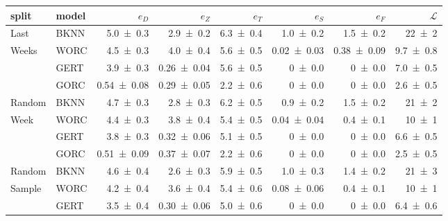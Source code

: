 \begin{table}[ht]
    \centering
    \begin{tabular}{llrrrrrr}
        \toprule
        split           & model &              $e_D$ &              $e_Z$ &              $e_T$ &              $e_S$ &              $e_F$ &      $\mathcal{L}$   \\
        \midrule
        Last            & BKNN  & \num{5.0 \pm 0.3 } & \num{2.9 \pm 0.2 } & \num{6.3 \pm 0.4 } & \num{1.0 \pm 0.2 } & \num{1.5 \pm 0.2 } & \num{22   \pm 2}   \\
        Weeks           & WORC  & \num{4.5 \pm 0.3 } & \num{4.0 \pm 0.4 } & \num{5.6 \pm 0.5 } & \num{0.02\pm 0.03} & \num{0.38\pm 0.09} & \num{ 9.7 \pm 0.8}   \\
                        & GERT  & \num{3.9 \pm 0.3 } & \num{0.26\pm 0.04} & \num{5.6 \pm 0.5 } & \num{0   \pm 0.0 } & \num{0   \pm 0.0 } & \num{ 7.0 \pm 0.5}   \\
                        & GORC  & \num{0.54\pm 0.08} & \num{0.29\pm 0.05} & \num{2.2 \pm 0.6 } & \num{0   \pm 0.0 } & \num{0   \pm 0.0 } & \num{ 2.6 \pm 0.5}   \\
        \midrule
        Random          & BKNN  & \num{4.7 \pm 0.3 } & \num{2.8 \pm 0.3 } & \num{6.2 \pm 0.5 } & \num{0.9 \pm 0.2 } & \num{1.5 \pm 0.2 } & \num{21   \pm 2}   \\
        Week            & WORC  & \num{4.4 \pm 0.3 } & \num{3.8 \pm 0.4 } & \num{5.4 \pm 0.5 } & \num{0.04\pm 0.04} & \num{0.4 \pm 0.1 } & \num{10   \pm 1}   \\
                        & GERT  & \num{3.8 \pm 0.3 } & \num{0.32\pm 0.06} & \num{5.1 \pm 0.5 } & \num{0   \pm 0.0 } & \num{0   \pm 0.0 } & \num{ 6.6 \pm 0.5}   \\
                        & GORC  & \num{0.51\pm 0.09} & \num{0.37\pm 0.07} & \num{2.2 \pm 0.6 } & \num{0   \pm 0.0 } & \num{0   \pm 0.0 } & \num{ 2.5 \pm 0.5}   \\
        \midrule
        Random          & BKNN  & \num{4.6 \pm 0.4 } & \num{2.6 \pm 0.3 } & \num{5.9 \pm 0.5 } & \num{1.0 \pm 0.3 } & \num{1.4 \pm 0.2 } & \num{21   \pm 3}   \\
        Sample          & WORC  & \num{4.2 \pm 0.4 } & \num{3.6 \pm 0.4 } & \num{5.4 \pm 0.6 } & \num{0.08\pm 0.06} & \num{0.4 \pm 0.1 } & \num{10   \pm 1}   \\
                        & GERT  & \num{3.5 \pm 0.4 } & \num{0.30\pm 0.06} & \num{5.0 \pm 0.6 } & \num{0   \pm 0.0 } & \num{0   \pm 0.0 } & \num{ 6.4 \pm 0.6}   \\

\end{tabular}
\end{table}
